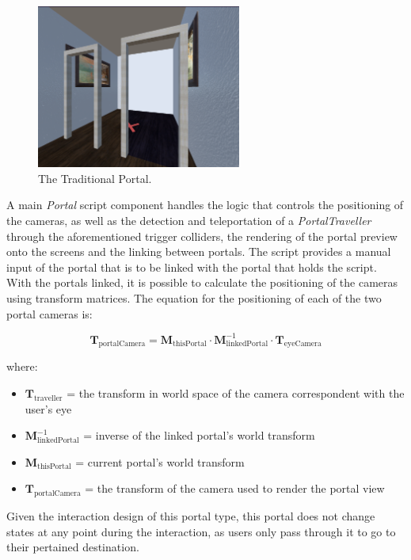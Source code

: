 \begin{figure}[t]
    \centering
     \includegraphics[width=0.6\textwidth]{NOVAthesisFiles/Images/screenshots/traditional-portal.PNG}
     \caption[The Traditional Portal.]
     {The Traditional Portal.}
     \label{fig:trad-portal-sc}
\end{figure}

A main \textit{Portal} script component handles the logic that controls the positioning of the cameras, as well as the detection and 
teleportation of a \textit{PortalTraveller} through the aforementioned trigger colliders, the rendering of the portal preview onto 
the screens and the linking between portals. The script provides a manual input of the portal that is to be linked with the portal that 
holds the script. 
With the portals linked, it is possible to calculate the positioning of the cameras using transform matrices. 
The equation for the positioning of each of the two portal cameras is:

\[
\mathbf{T}_{\text{portalCamera}} =
\mathbf{M}_{\text{thisPortal}} \cdot
\mathbf{M}_{\text{linkedPortal}}^{-1} \cdot
\mathbf{T}_{\text{eyeCamera}}
\]

where: 

\begin{itemize}
    \item $\mathbf{T}_{\text{traveller}}$ = the transform in world space of the camera correspondent with the user's eye
    \item $\mathbf{M}_{\text{linkedPortal}}^{-1}$ = inverse of the linked portal's world transform
    \item $\mathbf{M}_{\text{thisPortal}}$ = current portal's world transform
    \item $\mathbf{T}_{\text{portalCamera}}$ = the transform of the camera used to render the portal view
\end{itemize}

    
Given the interaction design of this portal type, this portal does not change states at any point during the interaction, as users only 
pass through it to go to their pertained destination.
    
